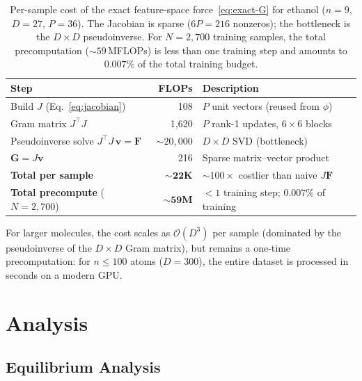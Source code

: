 \documentclass[11pt]{article}
\newcommand{\bF}{\mathbf{F}}
\newcommand{\bG}{\mathbf{G}}
\begin{document}
\begin{table}[h]
\centering
\caption{Per-sample cost of the exact feature-space force~\eqref{eq:exact-G} for ethanol ($n{=}9$, $D{=}27$, $P{=}36$).
The Jacobian is sparse ($6P = 216$ nonzeros); the bottleneck is the $D {\times} D$ pseudoinverse.
For $N = 2{,}700$ training samples, the total precomputation (${\sim}59$\,MFLOPs) is less than one training step and amounts to $0.007\%$ of the total training budget.}
\label{tab:feature-cost}
\footnotesize
\setlength{\tabcolsep}{5pt}
\begin{tabular}{@{}lrl@{}}
\toprule
Step & FLOPs & Description \\
\midrule
Build $J$ (Eq.~\ref{eq:jacobian}) & 108 & $P$ unit vectors (reused from $\phi$) \\
Gram matrix $J^\top J$ & 1,620 & $P$ rank-1 updates, $6{\times}6$ blocks \\
Pseudoinverse solve $J^\top J\, \mathbf{v} = \bF$ & ${\sim}20{,}000$ & $D {\times} D$ SVD (bottleneck) \\
$\bG = J\mathbf{v}$ & 216 & Sparse matrix--vector product \\
\midrule
\textbf{Total per sample} & $\mathbf{\sim\!22}$\textbf{K} & ${\sim}100{\times}$ costlier than naive $J\bF$ \\
\textbf{Total precompute} ($N{=}2{,}700$) & $\mathbf{\sim\!59}$\textbf{M} & $< 1$ training step; $0.007\%$ of training \\
\bottomrule
\end{tabular}
\end{table}

For larger molecules, the cost scales as $\mathcal{O}(D^3)$ per sample (dominated by the pseudoinverse of the $D \times D$ Gram matrix), but remains a one-time precomputation: for $n \leq 100$ atoms ($D = 300$), the entire dataset is processed in seconds on a modern GPU.

\section{Analysis}
\label{sec:theory}

\subsection{Equilibrium Analysis}
\label{sec:equilibrium}
\end{document}
